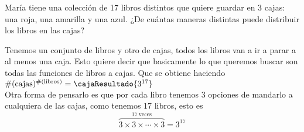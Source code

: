 \begin{enunciado}{\ejercicio}
  María tiene una colección de 17 libros distintos que quiere guardar en 3 cajas:
  una roja, una amarilla y una azul.
  ¿De cuántas maneras distintas puede distribuir los libros en las cajas?
\end{enunciado}

Tenemos un conjunto de libros y otro de cajas, todos los libros van a ir a parar a al menos una caja.
Esto quiere decir que basicamente lo que queremos buscar son todas las funciones de libros a cajas. 
Que se obtiene haciendo $\#(\text{cajas})^{\#(\text{libros})} = \cajaResultado{3^{17}}$ \\
Otra forma de pensarlo es que por cada libro tenemos $3$ opciones de mandarlo a cualquiera de las cajas,
como tenemos 17 libros, esto es
\[\overbrace{3 \times 3 \times \cdots \times 3}^{17\ \text{veces}} = 3^{17}\]

